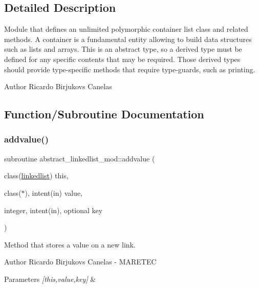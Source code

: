 \subsection{Detailed Description}
Module that defines an unlimited polymorphic container list class and related methods. A container is a fundamental entity allowing to build data structures such as lists and arrays. This is an abstract type, so a derived type must be defined for any specific contents that may be required. Those derived types should provide type-\/specific methods that require type-\/guards, such as printing. 

\begin{DoxyAuthor}{Author}
Ricardo Birjukovs Canelas 
\end{DoxyAuthor}


\subsection{Function/\+Subroutine Documentation}
\mbox{\label{namespaceabstract__linkedlist__mod_a1075e2f234dacc9daf8407e14fac0929}} 
\subsubsection{\texorpdfstring{addvalue()}{addvalue()}}
{\footnotesize\ttfamily subroutine abstract\+\_\+linkedlist\+\_\+mod\+::addvalue (\begin{DoxyParamCaption}\item[{class(\mbox{\hyperlink{structabstract__linkedlist__mod_1_1linkedlist}{linkedlist}})}]{this,  }\item[{class($\ast$), intent(in)}]{value,  }\item[{integer, intent(in), optional}]{key }\end{DoxyParamCaption})\hspace{0.3cm}{\ttfamily [private]}}



Method that stores a value on a new link. 

\begin{DoxyAuthor}{Author}
Ricardo Birjukovs Canelas -\/ M\+A\+R\+E\+T\+EC 
\end{DoxyAuthor}

\begin{DoxyParams}{Parameters}
{\em \mbox{[}this,value,key\mbox{]}} & \\
\hline
\end{DoxyParams}


